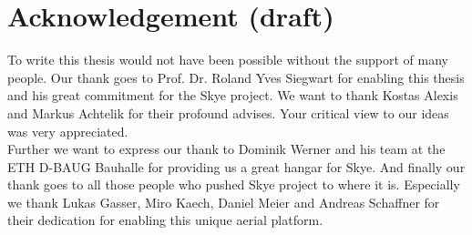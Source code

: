 \section{Acknowledgement (draft)}
To write this thesis would not have been possible without the support of many people.
Our thank goes to Prof. Dr. Roland Yves Siegwart for enabling this thesis and his great commitment for the Skye project.
We want to thank Kostas Alexis and Markus Achtelik for their profound advises.
Your critical view to our ideas was very appreciated. \\
Further we want to express our thank to Dominik Werner and his team at the ETH D-BAUG Bauhalle for providing us a great hangar for Skye.
And finally our thank goes to all those people who pushed Skye project to where it is.
Especially we thank Lukas Gasser, Miro Kaech, Daniel Meier and Andreas Schaffner for their dedication for enabling this unique aerial platform. 